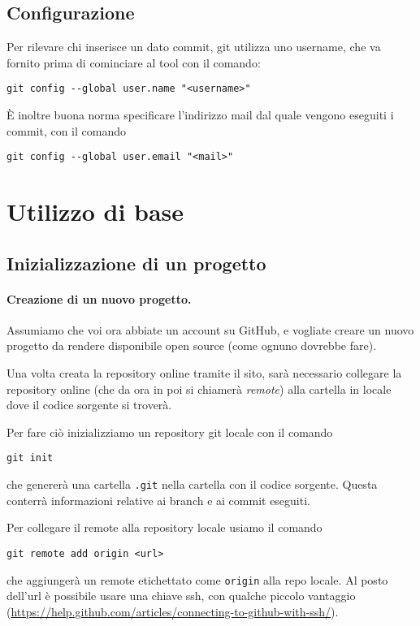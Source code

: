 \documentclass[a4paper, 11pt]{article}
\begin{document}
	
	\subsection{Configurazione}
	Per rilevare chi inserisce un dato commit, git utilizza uno username, che va fornito prima di cominciare al tool con il comando:
	\begin{lstlisting}
git config --global user.name "<username>"
	\end{lstlisting}
	
	È inoltre buona norma specificare l'indirizzo mail dal quale vengono eseguiti i commit, con il comando \begin{lstlisting}
git config --global user.email "<mail>"
	\end{lstlisting}
	
	\section{Utilizzo di base}
	\subsection{Inizializzazione di un progetto}
	\paragraph{Creazione di un nuovo progetto.}
	Assumiamo che voi ora abbiate un account su GitHub, e vogliate creare un nuovo progetto da rendere disponibile open source (come ognuno dovrebbe fare).
	
	Una volta creata la repository online tramite il sito, sarà necessario collegare la repository online (che da ora in poi si chiamerà \emph{remote}) alla cartella in locale dove il codice sorgente si troverà. 
	
	Per fare ciò inizializziamo un repository git locale con il comando \begin{lstlisting}
git init
	\end{lstlisting} che genererà una cartella \lstinline|.git| nella cartella con il codice sorgente. Questa conterrà informazioni relative ai branch e ai commit eseguiti.
	
	Per collegare il remote alla repository locale usiamo il comando \begin{lstlisting}
git remote add origin <url>
	\end{lstlisting}
	che aggiungerà un remote etichettato come \lstinline|origin| alla repo locale. Al posto dell'url è possibile usare una chiave ssh, con qualche piccolo vantaggio (\url{https://help.github.com/articles/connecting-to-github-with-ssh/}).
	
\end{document}
